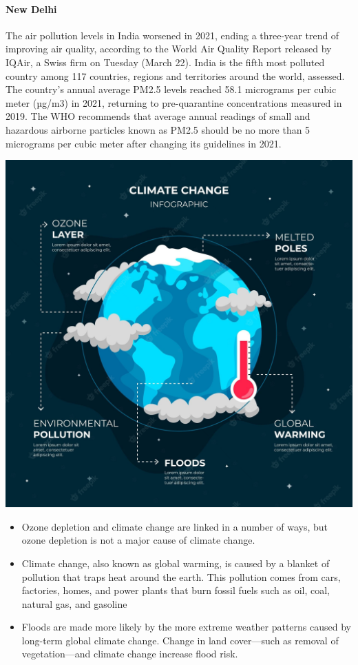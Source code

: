 \documentclass{article}
\begin{document}
\paragraph{New Delhi}The air pollution levels in India worsened in 2021, ending a three-year trend of improving air quality, according to the World Air Quality Report released by IQAir, a Swiss firm on Tuesday (March 22). India is the fifth most polluted country among 117 countries, regions and territories around the world, assessed. The country’s annual average PM2.5 levels reached 58.1 micrograms per cubic meter (µg/m3) in 2021, returning to pre-quarantine concentrations measured in 2019. The WHO recommends that average annual readings of small and hazardous airborne particles known as PM2.5 should be no more than 5 micrograms per cubic meter after changing its guidelines in 2021.

\newpage
\begin{center}
  \includegraphics[width=\linewidth]{climate2.jpg}
  \label{fig:1} 
\end{center}

\begin{itemize}
\item Ozone depletion and climate change are linked in a number of ways, but ozone depletion is not a major cause of climate change.
\item Climate change, also known as global warming, is caused by a blanket of pollution that traps heat around the earth. This pollution comes from cars, factories, homes, and power plants that burn fossil fuels such as oil, coal, natural gas, and gasoline
\item Floods are made more likely by the more extreme weather patterns caused by long-term global climate change. Change in land cover—such as removal of vegetation—and climate change increase flood risk.
\end{itemize}
\end{document}
